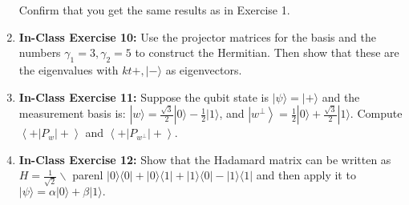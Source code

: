 \documentclass[main.tex]{subfiles}
\begin{document}
\begin{enumerate}
    Confirm that you get the same results as in Exercise 1.

\item[] \textbf{In-Class Exercise 10:} Use the projector matrices for the basis and the numbers $\gamma_{1}=3, \gamma_{2}=5$ to construct the Hermitian. Then show that these are the eigenvalues with $k t+,|-\rangle$ as eigenvectors.

\item[] \textbf{In-Class Exercise 11:} Suppose the qubit state is $|\psi\rangle=|+\rangle$ and the measurement basis is: $|w\rangle=\frac{\sqrt{3}}{2}|0\rangle-\frac{1}{2}|1\rangle$, and $\left|w^{\perp}\right\rangle=\frac{1}{2}|0\rangle+\frac{\sqrt{3}}{2}|1\rangle .$ Compute $\left\langle+\left|P_{w}\right|+\right\rangle$ and $\left\langle+\left|P_{w^{\perp}}\right|+\right\rangle .$

\item[] \textbf{In-Class Exercise 12:} Show that the Hadamard matrix can be written as $H=\frac{1}{\sqrt{2}} \backslash$ parenl $|0\rangle\langle 0|+| 0\rangle\langle 1|+| 1\rangle\langle 0|-| 1\rangle\langle 1|$ and then apply it to $|\psi\rangle=\alpha|0\rangle+\beta|1\rangle .$

\end{enumerate}
\end{document}
